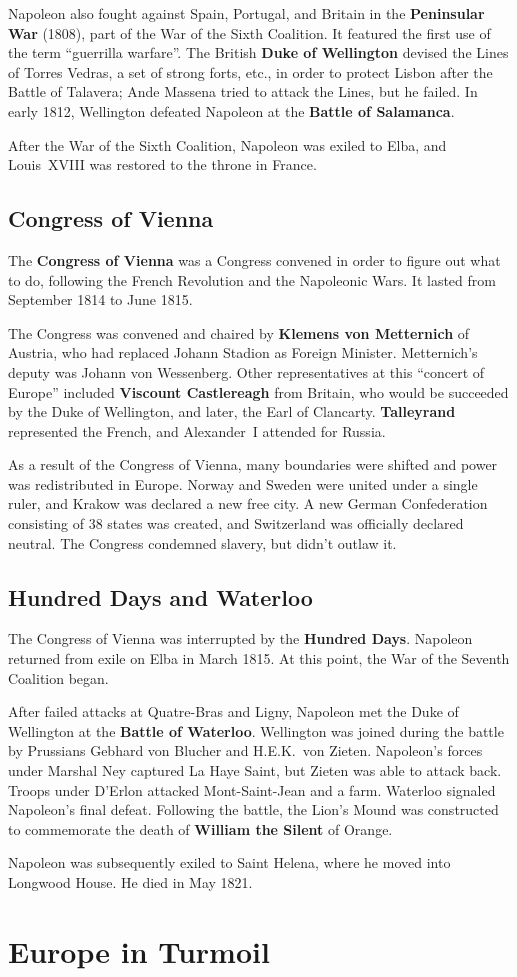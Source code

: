 Napoleon also fought against Spain, Portugal, and Britain in the \textbf{Peninsular War} (1808),
part of the War of the Sixth Coalition.
It featured the first use of the term ``guerrilla warfare''.
The British \textbf{Duke of Wellington} devised the Lines of Torres Vedras, a set of strong forts, etc.,
in order to protect Lisbon after the Battle of Talavera;
Ande Massena tried to attack the Lines, but he failed.
In early 1812, Wellington defeated Napoleon at the \textbf{Battle of Salamanca}.

After the War of the Sixth Coalition, Napoleon was exiled to Elba,
and Louis~XVIII was restored to the throne in France.

\subsection*{Congress of Vienna}

The \textbf{Congress of Vienna} was a Congress convened in order to figure out what to do,
following the French Revolution and the Napoleonic Wars.
It lasted from September 1814 to June 1815.

The Congress was convened and chaired by \textbf{Klemens von Metternich} of Austria,
who had replaced Johann Stadion as Foreign Minister.
Metternich's deputy was Johann von Wessenberg.
Other representatives at this ``concert of Europe'' included
\textbf{Viscount Castlereagh} from Britain, who would be succeeded by the Duke of Wellington,
and later, the Earl of Clancarty.
\textbf{Talleyrand} represented the French,
and Alexander~I attended for Russia.

As a result of the Congress of Vienna, many boundaries were shifted and power was redistributed in Europe.
Norway and Sweden were united under a single ruler, and Krakow was declared a new free city.
A new German Confederation consisting of 38 states was created,
and Switzerland was officially declared neutral.
The Congress condemned slavery, but didn't outlaw it.

\subsection*{Hundred Days and Waterloo}
The Congress of Vienna was interrupted by the \textbf{Hundred Days}.
Napoleon returned from exile on Elba in March 1815.
At this point, the War of the Seventh Coalition began.

After failed attacks at Quatre-Bras and Ligny,
Napoleon met the Duke of Wellington at the \textbf{Battle of Waterloo}.
Wellington was joined during the battle by Prussians Gebhard von Blucher and H.E.K.\ von Zieten.
Napoleon's forces under Marshal Ney captured La Haye Saint, but Zieten was able to attack back.
Troops under D'Erlon attacked Mont-Saint-Jean and a farm.
Waterloo signaled Napoleon's final defeat.
Following the battle, the Lion's Mound was constructed
to commemorate the death of \textbf{William the Silent} of Orange.

Napoleon was subsequently exiled to Saint Helena, where he moved into Longwood House.
He died in May 1821.

\section{Europe in Turmoil}

